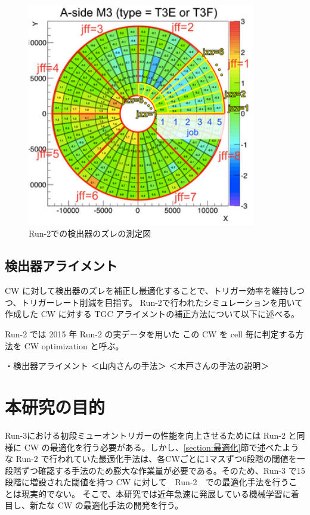 \begin{figure}[tb]
  \centering
  \includegraphics[clip, width=10cm]{fig/4/zure.png}
  \caption{Run-2での検出器のズレの測定図}
  \label{fig:ズレ}
\end{figure}


\subsection{検出器アライメント}
CW に対して検出器のズレを補正し最適化することで、トリガー効率を維持しつつ、トリガーレート削減を目指す。
Run-2で行われたシミュレーションを用いて作成した CW に対する TGC アライメントの補正方法について以下に述べる。


Run-2 では
2015 年 Run-2 の実データを用いた
この CW を cell 毎に判定する方法を CW optimization と呼ぶ。


・検出器アライメント
＜山内さんの手法＞
＜木戸さんの手法の説明＞


\section{本研究の目的}
Run-3における初段ミューオントリガーの性能を向上させるためには Run-2 と同様に CW の最適化を行う必要がある。しかし、\ref{section:最適化}節で述べたような Run-2 で行われていた最適化手法は、各CWごとに1マスずつ6段階の閾値を一段階ずつ確認する手法のため膨大な作業量が必要である。そのため、Run-3 で15段階に増設された閾値を持つ CW に対して　Run-2　での最適化手法を行うことは現実的でない。
そこで、本研究では近年急速に発展している機械学習に着目し、新たな CW の最適化手法の開発を行う。















